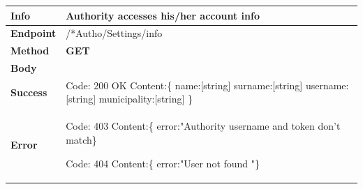 \begin{table}[H]
\begin{tabular}{|l|p{}|}
\hline
\textbf{Info}             & Authority accesses his/her account info                                                                      \\ \hline
\textbf{Endpoint}    &  /*Autho/Settings/info\\ \hline
\textbf{Method}         &   \textbf{GET}                                                                            \\ \hline

\textbf{Body}  &
                    \\ \hline
                    
\textbf{Success} &  Code: 200 OK \newline
                    Content:\{\newline 
                    name:[string]\newline
                 surname:[string]\newline
                 username:[string]\newline
                 municipality:[string]\newline
                    \}\\ \hline
\textbf{Error} &  
                  Code: 403 \newline
                  Content:\{\newline
                  error:"Authority username and token don't match\newline\}\newline
                  
                  Code: 404 \newline
                  Content:\{\newline
                  error:"User not found "\newline\}\\\hline

\end{tabular}
\end{table}






